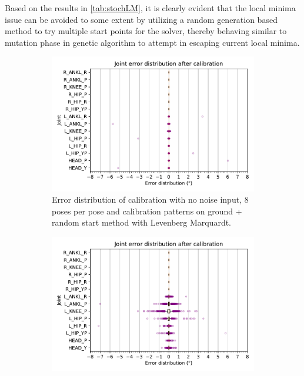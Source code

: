 \documentclass[english, printversion, nomenclature, notitle]{tuvisionthesis} %
\begin{document}
Based on the results in \cref{tab:stochLM}, it is clearly evident that the local minima issue can be avoided to some extent by utilizing a random generation based method to try multiple start points for the solver, thereby behaving similar to mutation phase in genetic algorithm to attempt in escaping current local minima.

\begin{figure}
	\centering
	\begin{subfigure}{\columnwidth}
		\includegraphics[width=\columnwidth]{stochLM_NO_outafter_hist.pdf}
		\caption[Error distribution of calibration with no noise input, 8 poses per pose and calibration patterns on ground + random start method with Levenberg Marquardt.]{Error distribution of calibration with no noise input, 8 poses per pose and calibration patterns on ground + random start method with Levenberg Marquardt.}
	\end{subfigure}
	\begin{subfigure}{\columnwidth}
		\includegraphics[width=\columnwidth]{stochLM_both_outafter_hist.pdf}

\end{subfigure}
\end{figure}
\end{document}
